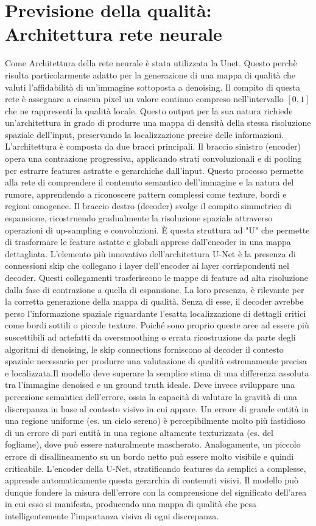\section{Previsione della qualità: Architettura rete neurale}
Come Architettura della rete neurale è stata utilizzata la Unet. Questo perchè risulta particolarmente adatto per la 
generazione di una mappa di qualità che valuti l'affidabilità di un'immagine sottoposta a denoising. Il compito di 
questa rete è assegnare a ciascun pixel un valore continuo compreso nell'intervallo $[0,1]$ che ne rappresenti la 
qualità locale. Questo output per la sua natura richiede un'architettura in grado di produrre una mappa di densità 
della stessa risoluzione spaziale dell'input, preservando la localizzazione precise delle informazioni. 
L'architettura è composta da due bracci principali. Il braccio sinistro (encoder) opera una contrazione 
progressiva, applicando strati convoluzionali e di pooling per estrarre features astratte e gerarchiche 
dall'input. Questo processo permette alla rete di comprendere il contenuto semantico dell'immagine e la 
natura del rumore, apprendendo a riconoscere pattern complessi come texture, bordi e regioni omogenee. 
Il braccio destro (decoder) svolge il compito simmetrico di espansione, ricostruendo gradualmente la 
risoluzione spaziale attraverso operazioni di up-sampling e convoluzioni. È questa struttura ad "U" 
che permette di trasformare le feature astatte e globali apprese dall'encoder in una mappa 
dettagliata. L'elemento più innovativo dell'architettura U-Net è la presenza di connessioni skip che collegano i layer 
dell'encoder ai layer corrispondenti nel decoder. Questi collegamenti trasferiscono le mappe di feature 
ad alta risoluzione dalla fase di contrazione a quella di espansione. La loro presenza, è rilevante per la 
corretta generazione della mappa di qualità. Senza di esse, il decoder avrebbe perso l'informazione spaziale riguardante 
l'esatta localizzazione di dettagli critici come bordi sottili o piccole texture. Poiché sono proprio 
queste aree ad essere più suscettibili ad artefatti da oversmoothing o errata ricostruzione da parte degli 
algoritmi di denoising, le skip connections forniscono al decoder il contesto spaziale necessario per 
produrre una valutazione di qualità estremamente precisa e localizzata.Il modello deve superare la semplice stima 
di una differenza assoluta tra l'immagine denoised e un ground truth ideale. 
Deve invece sviluppare una percezione semantica dell'errore, ossia la capacità di valutare la gravità di una discrepanza 
in base al contesto visivo in cui appare. Un errore di grande entità in una regione uniforme (es. un cielo sereno) è 
percepibilmente molto più fastidioso di un errore di pari entità in una regione altamente texturizzata (es. del fogliame), 
dove può essere naturalmente mascherato. Analogamente, un piccolo errore di disallineamento su un bordo netto può essere molto 
visibile e quindi criticabile. L'encoder della U-Net, stratificando features da semplici a complesse, apprende automaticamente 
questa gerarchia di contenuti visivi. Il modello può dunque fondere la misura dell'errore con la comprensione del significato 
dell'area in cui esso si manifesta, producendo una mappa di qualità che pesa intelligentemente l'importanza visiva di ogni discrepanza.
